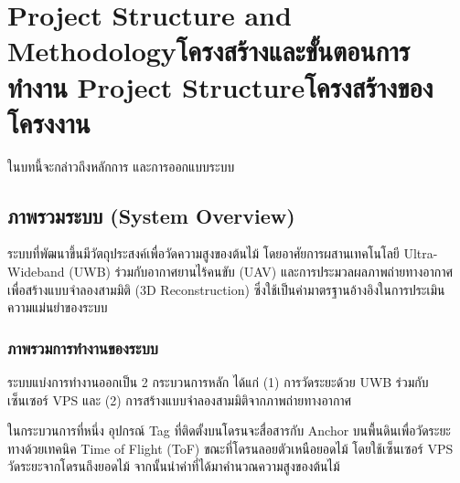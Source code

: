 \chapter{\ifproject%
\ifenglish Project Structure and Methodology\else โครงสร้างและขั้นตอนการทำงาน\fi
\else%
\ifenglish Project Structure\else โครงสร้างของโครงงาน\fi
\fi
}

ในบทนี้จะกล่าวถึงหลักการ และการออกแบบระบบ

\makeatletter


\makeatother

\section{ภาพรวมระบบ (System Overview)}
ระบบที่พัฒนาขึ้นมีวัตถุประสงค์เพื่อวัดความสูงของต้นไม้ โดยอาศัยการผสานเทคโนโลยี Ultra-Wideband (UWB) ร่วมกับอากาศยานไร้คนขับ (UAV) และการประมวลผลภาพถ่ายทางอากาศเพื่อสร้างแบบจำลองสามมิติ (3D Reconstruction) ซึ่งใช้เป็นค่ามาตรฐานอ้างอิงในการประเมินความแม่นยำของระบบ

\subsection{ภาพรวมการทำงานของระบบ}
ระบบแบ่งการทำงานออกเป็น 2 กระบวนการหลัก ได้แก่ (1) การวัดระยะด้วย UWB ร่วมกับเซ็นเซอร์ VPS และ (2) การสร้างแบบจำลองสามมิติจากภาพถ่ายทางอากาศ

ในกระบวนการที่หนึ่ง อุปกรณ์ Tag ที่ติดตั้งบนโดรนจะสื่อสารกับ Anchor บนพื้นดินเพื่อวัดระยะทางด้วยเทคนิค Time of Flight (ToF) ขณะที่โดรนลอยตัวเหนือยอดไม้ โดยใช้เซ็นเซอร์ VPS วัดระยะจากโดรนถึงยอดไม้ จากนั้นนำค่าที่ได้มาคำนวณความสูงของต้นไม้

